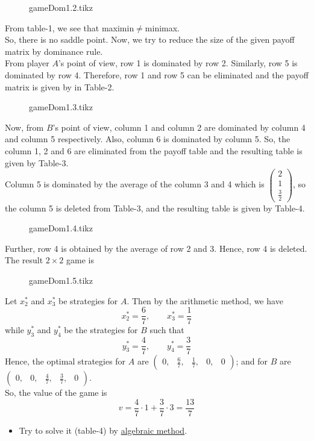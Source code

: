 \documentclass[../main-sheet.tex]{subfiles}
\begin{document}
    \begin{soln}
        \hfill
        \begin{figure}[H]
            \centering
            {gameDom1.2.tikz}
        \end{figure}
        From table-1, we see that maximin\(\neq\)minimax.\\
        So, there is no saddle point. Now, we try to reduce the size of the given payoff matrix by dominance rule.\\
        From player \(A\)'s point of view, row 1 is dominated by row 2. Similarly, row 5 is dominated by row 4. Therefore, row 1 and row 5 can be eliminated and the payoff matrix is given by in Table-2.
        \begin{figure}[H]
            \centering
            {gameDom1.3.tikz}
        \end{figure}
        Now, from \(B\)'s point of view, column 1 and column 2 are dominated by column 4 and column 5 respectively. Also, column 6 is dominated by column 5. So, the column 1, 2 and 6 are eliminated from the payoff table and the resulting table is given by Table-3.\\
        Column 5 is dominated by the average of the column 3 and 4 which is \(\begin{pmatrix}
            2\\
            1\\
            \frac{3}{2}
        \end{pmatrix}\), so the column 5 is deleted from Table-3, and the resulting table is given by Table-4.
        \begin{figure}[H]
            \centering
            {gameDom1.4.tikz}
        \end{figure}
        Further, row 4 is obtained by the average of row 2 and 3. Hence, row 4 is deleted. The result \(2\times 2\) game is
        \begin{figure}[H]
            \centering
            {gameDom1.5.tikz}
        \end{figure}
        Let \(x_2^{*}\) and \(x_3^{*}\) be strategies for \(A\). Then by the arithmetic method, we have 
        \[
            x_2^{*}=\frac{6}{7},\qquad x_3^{*}=\frac{1}{7}
        \]
        while \(y_3^{*}\) and \(y_4^{*}\) be the strategies for \(B\) such that 
        \[
            y_3^{*}=\frac{4}{7},\qquad y_4^{*}=\frac{3}{7}
        \]
        Hence, the optimal strategies for \(A\) are \(\begin{pmatrix}
            0,&\frac{6}{7},&\frac{1}{7},&0,&0
        \end{pmatrix}\); and for \(B\) are \(\begin{pmatrix}
            0,&0,&\frac{4}{7},&\frac{3}{7},&0
        \end{pmatrix}\).\\
        So, the value of the game is 
        \[
            v=\frac{4}{7}\cdot 1+\frac{3}{7}\cdot 3=\frac{13}{7}
        \]
    \end{soln}
    \begin{itemize}
        \item Try to solve it (table-4) by \underline{algebraic method}.
    \end{itemize}
\end{document}
